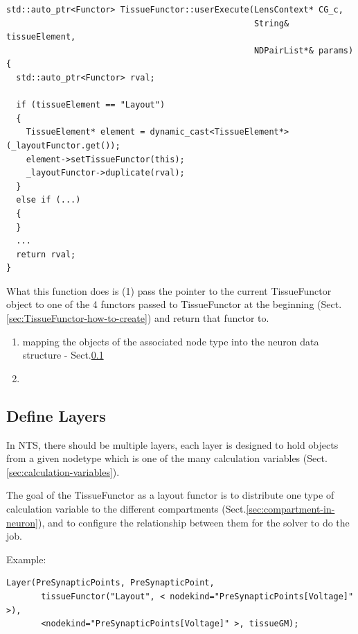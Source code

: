 \begin{verbatim}
std::auto_ptr<Functor> TissueFunctor::userExecute(LensContext* CG_c,
                                                  String& tissueElement,
                                                  NDPairList*& params)
{
  std::auto_ptr<Functor> rval;

  if (tissueElement == "Layout")
  {
    TissueElement* element = dynamic_cast<TissueElement*>(_layoutFunctor.get());
    element->setTissueFunctor(this);
    _layoutFunctor->duplicate(rval);
  }
  else if (...)
  {
  }
  ...
  return rval;
}
\end{verbatim}
What this function does is (1) pass the pointer to the current TissueFunctor
object to one of the 4 functors passed to TissueFunctor at the
beginning (Sect.\ref{sec:TissueFunctor-how-to-create}) and return that 
functor to.
\begin{enumerate}
  \item mapping the objects of the associated node type into the neuron data
  structure - Sect.\ref{sec:TissueFunctor-as-layout-functor}

  \item
\end{enumerate}

\subsection{Define Layers}
\label{sec:TissueFunctor-as-layout-functor}

In NTS, there should be multiple layers, each layer is designed to hold objects
from a given nodetype which is one of the many calculation variables
(Sect.\ref{sec:calculation-variables}).

The goal of the TissueFunctor as a layout functor is to distribute one type of
calculation variable to the different compartments
(Sect.\ref{sec:compartment-in-neuron}), and to configure the relationship
between them for the solver to do the job.


Example: 
\begin{verbatim}
Layer(PreSynapticPoints, PreSynapticPoint, 
       tissueFunctor("Layout", < nodekind="PreSynapticPoints[Voltage]" >), 
       <nodekind="PreSynapticPoints[Voltage]" >, tissueGM); 
\end{verbatim}

